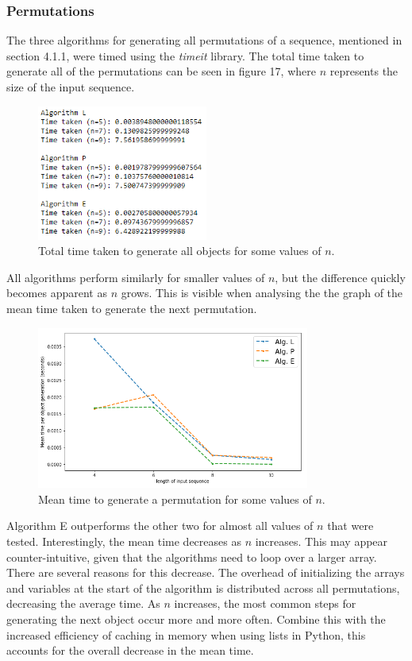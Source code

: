 \documentclass[12pt]{article}
\begin{document}
\subsubsection{Permutations}
The three algorithms for generating all permutations of a sequence, mentioned in section 4.1.1, were timed using the \textit{timeit} library. The total time taken to generate all of the permutations can be seen in figure 17, where \(n\) represents the size of the input sequence.

\begin{figure}[h]
\centering
\includegraphics[width=0.5\textwidth]{images/perm_times.PNG}
\caption{Total time taken to generate all objects for some values of \(n\).}
\end{figure}

All algorithms perform similarly for smaller values of \(n\), but the difference quickly becomes apparent as \(n\) grows. This is visible when analysing the the graph of the mean time taken to generate the next permutation.

\begin{figure}[h]
\centering
\includegraphics[width=0.8\textwidth]{images/perm_graph1.PNG}
\caption{Mean time to generate a permutation for some values of \(n\).}
\end{figure}

Algorithm E outperforms the other two for almost all values of \(n\) that were tested. Interestingly, the mean time decreases as \(n\) increases. This may appear counter-intuitive, given that the algorithms need to loop over a larger array. There are several reasons for this decrease. The overhead of initializing the arrays and variables at the start of the algorithm is distributed across all permutations, decreasing the average time. As \(n\) increases, the most common steps for generating the next object occur more and more often. Combine this with the increased efficiency of caching in memory when using lists in Python, this accounts for the overall decrease in the mean time.
\end{document}
